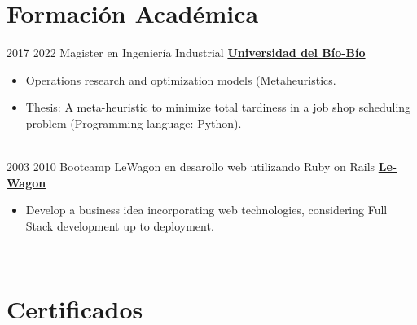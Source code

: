 \documentclass[letterpaper]{DS_class_file} %
\begin{document}
\makeprofile %

\section{Formación Académica}

\begin{twenty} %
   	\twentyitem
	    {2017}
		{2022}
	    {\hspace{0.2cm}Magister en Ingeniería Industrial}
	    {\href{https://magister.industrial.ubiobio.cl/}{\hspace{0.27cm} \textbf{Universidad del Bío-Bío} }}
	    {}
	    {\begin{itemize}
			\item Operations research and optimization models (Metaheuristics.
			\item Thesis: A meta-heuristic to minimize total tardiness in a job shop scheduling problem (Programming language: Python).
		\end{itemize}}
		\\
	   	\twentyitem
			{2003}
			{2010}
			{\hspace{0.2cm}Bootcamp LeWagon en desarollo web utilizando Ruby on Rails}
			{\href{https://www.lewagon.com}{\hspace{0.27cm} \textbf{Le-Wagon} }}
			{}
			{\begin{itemize}
					\item Develop a business idea incorporating web technologies, considering Full Stack development up to deployment.
			\end{itemize}}
			\\
\end{twenty}


\section{Certificados}
\end{document}
